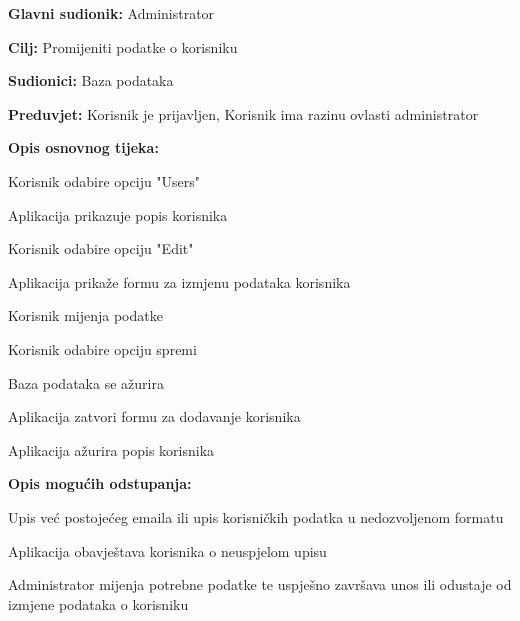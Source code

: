 					\noindent {}
					\begin{packed_item}

						\item \textbf{Glavni sudionik:} Administrator
						\item \textbf{Cilj:} Promijeniti podatke o korisniku
						\item \textbf{Sudionici:} Baza podataka
						\item \textbf{Preduvjet:} Korisnik je prijavljen, Korisnik ima razinu ovlasti administrator
						\item \textbf{Opis osnovnog tijeka:}

						\item[] \begin{packed_enum}

							\item Korisnik odabire opciju "Users"
							\item Aplikacija prikazuje popis korisnika
							\item Korisnik odabire opciju "Edit"
							\item Aplikacija prikaže formu za izmjenu podataka korisnika
							\item Korisnik mijenja podatke
							\item Korisnik odabire opciju spremi
							\item Baza podataka se ažurira
							\item Aplikacija zatvori formu za dodavanje korisnika
							\item Aplikacija ažurira popis korisnika
						\end{packed_enum}

						\item \textbf{Opis mogućih odstupanja:}

						\item[] \begin{packed_item}

							\item[2.f] Upis već postojećeg emaila ili upis korisničkih
							podatka u nedozvoljenom formatu
							\item[] \begin{packed_enum}

								\item Aplikacija obavještava korisnika o neuspjelom upisu
								\item Administrator mijenja potrebne podatke te uspješno završava unos ili
								odustaje od izmjene podataka o korisniku

							\end{packed_enum}

						\end{packed_item}
					\end{packed_item}

